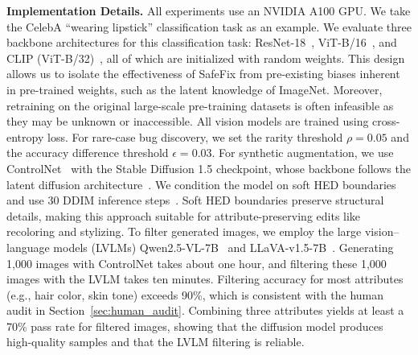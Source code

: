 \documentclass[10pt]{article} %
\newcommand{\controlnet}{ControlNet\xspace}
\newcommand{\qwen}{Qwen2.5-VL\xspace}
\newcommand{\llava}{LLaVA-v1.5\xspace}
\begin{document}
\noindent \textbf{Implementation Details.} All experiments use an NVIDIA A100 GPU\@.
We take the CelebA ``wearing lipstick'' classification task as an example.  
We evaluate three backbone architectures for this classification task: ResNet-18~\citep{he2016deep}, ViT-B/16~\citep{dosovitskiy2020vit}, and CLIP (ViT-B/32)~\citep{radford2021learning}, all of which are initialized with random weights. This design allows us to isolate the effectiveness of SafeFix from pre-existing biases inherent in pre-trained weights, such as the latent knowledge of ImageNet. Moreover, retraining on the original large-scale pre-training datasets is often infeasible as they may be unknown or inaccessible. All vision models are trained using cross-entropy loss. For rare-case bug discovery, we set the rarity threshold \(\rho = 0.05\) and the accuracy difference threshold \(\epsilon = 0.03\). For synthetic augmentation, we use \controlnet~\citep{zhang2023adding} with the Stable Diffusion 1.5 checkpoint, whose backbone follows the latent diffusion architecture~\citep{rombach2022high}. We condition the model on soft HED boundaries~\citep{xie2015holistically} and use 30 DDIM inference steps~\citep{song2021ddim}. Soft HED boundaries preserve structural details, making this approach suitable for attribute-preserving edits like recoloring and stylizing.
To filter generated images, we employ the large vision--language models (LVLMs) \qwen{}-7B~\citep{bai2025qwen25vl} and \llava{}-7B~\citep{liu2023improvedllava}. Generating 1,000 images with ControlNet takes about one hour, and filtering these 1,000 images with the LVLM takes ten minutes. Filtering accuracy for most attributes (e.g., hair color, skin tone) exceeds 90\%, which is consistent with the human audit in Section~\ref{sec:human_audit}. Combining three attributes yields at least a 70\% pass rate for filtered images, showing that the diffusion model produces high-quality samples and that the LVLM filtering is reliable.
\end{document}

